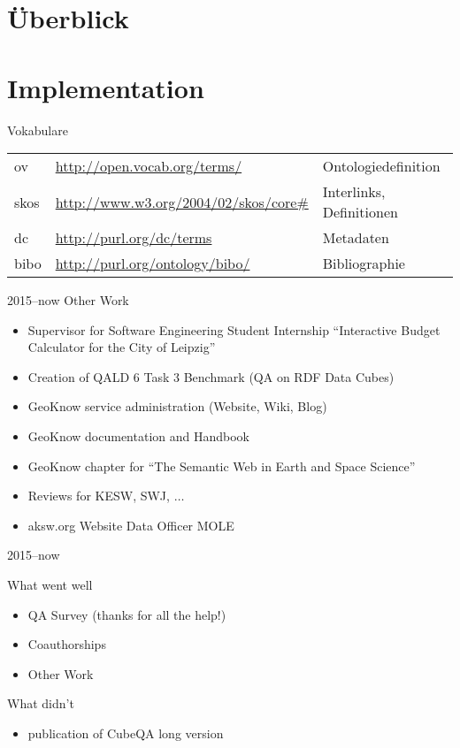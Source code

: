 \documentclass[14pt,aspectratio=1610]{beamer}
\author{\texorpdfstring{Konrad Höffner\newline\url{konrad.hoeffner@imise.uni-leipzig.de}}{Konrad Höffner}}
\title{}
\subtitle{SNIK Ontologie}
\begin{document}
\begin{frame}
\titlepage
\end{frame}

\section{Überblick}
\section{Implementation}

\begin{frame}{Vokabulare}
\begin{tabular}{lll}
ov		&\url{http://open.vocab.org/terms/}		&Ontologiedefinition\\
skos		&\url{http://www.w3.org/2004/02/skos/core\#}	&Interlinks, Definitionen\\
dc		&\url{http://purl.org/dc/terms}			&Metadaten\\
bibo		&\url{http://purl.org/ontology/bibo/}		&Bibliographie\\
\end{tabular}
\end{frame}

\begin{frame}{2015--now Other Work}
\begin{itemize}
\item Supervisor for Software Engineering Student Internship \enquote{Interactive Budget Calculator for the City of Leipzig}
\item Creation of QALD 6 Task 3 Benchmark (QA on RDF Data Cubes)
\item GeoKnow service administration (Website, Wiki, Blog)
\item GeoKnow documentation and Handbook
\item GeoKnow chapter for \enquote{The Semantic Web in Earth and Space Science}
\item Reviews for KESW, SWJ, $\ldots$
\item aksw.org Website Data Officer MOLE
\end{itemize}
\end{frame}

\begin{frame}{2015--now }
\begin{block}{What went well}
\begin{itemize}
\item QA Survey (thanks for all the help!) 
\item Coauthorships 
\item Other Work 
\end{itemize}
\end{block}
\begin{block}{What didn't}
\begin{itemize}
\item publication of CubeQA long version
\end{itemize}
\end{block}
\end{frame}
\end{document}
